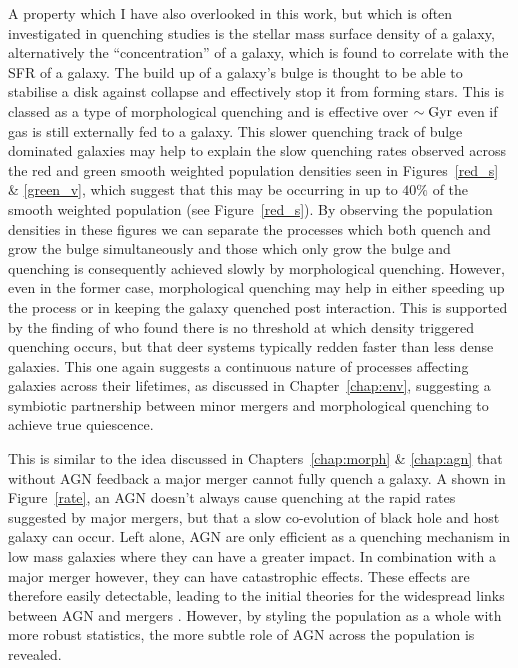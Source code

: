 A property which I have also overlooked in this work, but which is often investigated in quenching studies is the stellar mass surface density of a galaxy, alternatively the ``concentration'' of a galaxy, which is found to correlate with the SFR of a galaxy. The build up of a galaxy's bulge is thought to be able to stabilise a disk against collapse and effectively stop it from forming stars. This is classed as a type of morphological quenching and is effective over $\sim\rm{Gyr}$ even if gas is still externally fed to a galaxy. This slower quenching track of bulge dominated galaxies may help to explain the slow quenching rates observed across the red and green smooth weighted population densities seen in Figures~\ref{red_s} \& \ref{green_v}, which suggest that this may be occurring in up to $40\%$ of the smooth weighted population (see Figure~\ref{red_s}). By observing the population densities in these figures we can separate the processes which both quench and grow the bulge simultaneously and those which only grow the bulge and quenching is consequently achieved slowly by morphological quenching. However, even in the former case, morphological quenching may help in either speeding up the process or in keeping the galaxy quenched post interaction. This is supported by the finding of \cite{abramson16} who found there is no threshold at which density triggered quenching occurs, but that deer systems typically redden faster than less dense galaxies. This one again suggests a continuous nature of processes affecting galaxies across their lifetimes, as discussed in Chapter~\ref{chap:env}, suggesting a symbiotic partnership between minor mergers and morphological quenching to achieve true quiescence. 

This is similar to the idea discussed in Chapters~\ref{chap:morph} \& \ref{chap:agn} that without AGN feedback a major merger cannot fully quench a galaxy. A shown in Figure~\ref{rate}, an AGN doesn't always cause quenching at the rapid rates suggested by major mergers, but that a slow co-evolution of black hole and host galaxy can occur. Left alone, AGN are only efficient as a quenching mechanism in low mass galaxies where they can have a greater impact. In combination with a major merger however, they can have catastrophic effects. These effects are therefore easily detectable, leading to the initial theories for the widespread links between AGN and mergers \citep{refs bomb}. However, by styling the population as a whole with more robust statistics, the more subtle role of AGN across the population is revealed. 

